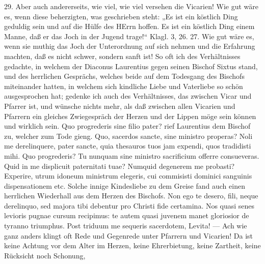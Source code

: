 29. Aber auch andererseits, wie viel, wie viel versehen die Vicarien! Wie gut wäre es, wenn diese beherzigten, was geschrieben steht: „Es ist ein köstlich Ding geduldig sein und auf die Hülfe des HErrn hoffen. Es ist ein köstlich Ding einem Manne, daß er das Joch in der Jugend trage!“ Klagl. 3, 26. 27. Wie gut wäre es, wenn sie muthig das Joch der Unterordnung auf sich nehmen
und die Erfahrung machten, daß es nicht schwer, sondern sanft ist! So oft ich des Verhältnisses gedachte, in welchem der Diaconus Laurentius gegen seinen Bischof Sixtus stand, und des herrlichen Gesprächs, welches beide auf dem Todesgang des Bischofs miteinander hatten, in welchem sich kindliche Liebe und Vaterliebe so schön ausgesprochen hat; gedenke ich auch des Verhältnisses, das zwischen Vicar und Pfarrer ist, und wünsche nichts mehr, als daß zwischen allen Vicarien und Pfarrern ein gleiches Zwiegespräch der Herzen und der Lippen möge sein können und wirklich sein. Quo progrederis sine filio pater? rief Laurentius dem Bischof zu, welcher zum Tode gieng. Quo, sacerdos sancte, sine ministro properas? Noli me derelinquere, pater sancte, quia thesauros tuos jam expendi, quos tradidisti mihi. Quo progrederis? Tu nunquam sine ministro sacrificium offerre consueveras. Quid in me displicuit paternitati tuae? Numquid degenerem me probasti? Experire, utrum idoneum ministrum elegeris, cui commisisti dominici sanguinis dispensationem etc. Solche innige Kindesliebe zu dem Greise fand auch einen herrlichen Wiederhall aus dem Herzen des Bischofs. Non ego te desero, fili, neque derelinquo, sed majora tibi debentur pro Christi fide certamina. Nos quasi senes levioris pugnae cursum recipimus: te autem quasi juvenem manet gloriosior de tyranno triumphus. Post triduum me sequeris sacerdotem, Levita! — Ach wie ganz anders klingt oft Rede und Gegenrede unter Pfarrern und Vicarien! Da ist keine Achtung vor dem Alter im Herzen, keine Ehrerbietung, keine Zartheit, keine Rücksicht noch Schonung,
